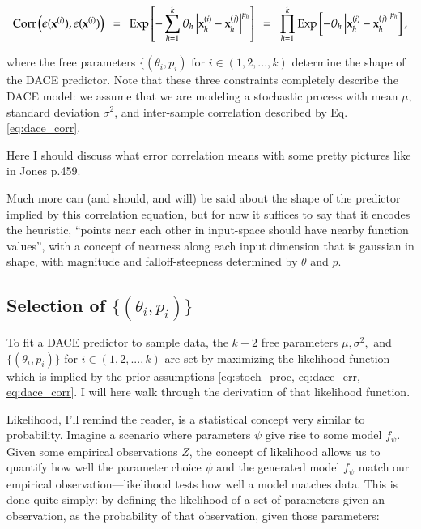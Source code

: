 \begin{equation} \label{eq:dace_corr}
\text{Corr}\left(\epsilon(\X^{(i)}),\epsilon(\X^{(i)})\right)\ \  = \ \ 
	\text{Exp}
		\left [ 
			-\sum_{h=1}^{k} 
				\theta_h \left | \X^{(i)}_h - \X^{(j)}_h \right | ^{p_h}
		\right ]\ \  = \ \ 
	\prod_{h=1}^{k}
		\text{Exp}
			\left [
				-\theta_h \left | \X^{(i)}_h - \X^{(j)}_h \right | ^{p_h}
			\right ],
\end{equation}

where the free parameters $\{(\theta_i,p_i)$ for $i \in (1,2,...,k)$ determine the shape of the DACE predictor. Note that these three constraints completely describe the DACE model: we assume that we are modeling a stochastic process with mean $\mu$, standard deviation $\sigma^2$, and inter-sample correlation described by Eq. \ref{eq:dace_corr}.

Here I should discuss what error correlation means with some pretty pictures like in Jones p.459.

Much more can (and should, and will) be said about the shape of the predictor implied by this correlation equation, but for now it suffices to say that it encodes the heuristic, ``points near each other in input-space should have nearby function values'', with a concept of nearness along each input dimension that is gaussian in shape, with magnitude and falloff-steepness determined by $\theta$ and $p$.

\subsection{Selection of $\{(\theta_i,p_i)\}$}\label{sec:max_lik}
To fit a DACE predictor to sample data, the $k+2$ free parameters $\mu, \sigma^2,$ and $\{(\theta_i,p_i)\}$ for $i \in (1,2,...,k)$ are set by maximizing the likelihood function which is implied by the prior assumptions \ref{eq:stoch_proc, eq:dace_err, eq:dace_corr}. I will here walk through the derivation of that likelihood function.

Likelihood, I'll remind the reader, is a statistical concept very similar to probability. %
Imagine a scenario where parameters $\psi$ give rise to some model $f_\psi$. Given some empirical observations $Z$, the concept of likelihood allows us to quantify how well the parameter choice $\psi$ and the generated model $f_\psi$ match our empirical observation---likelihood tests how well a model matches data. This is done quite simply: by defining the likelihood of a set of parameters given an observation, as the probability of that observation, given those parameters:

